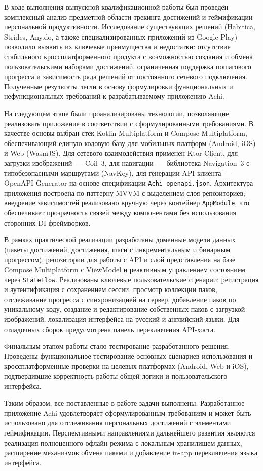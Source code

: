 \documentclass[../main.tex]{subfiles}
\begin{document}
В ходе выполнения выпускной квалификационной работы был проведён комплексный анализ предметной области трекинга достижений и геймификации персональной продуктивности. Исследование существующих решений (Habitica, Strides, Any.do, а также специализированных приложений из Google Play) позволило выявить их ключевые преимущества и недостатки: отсутствие стабильного кроссплатформенного продукта с возможностью создания и обмена пользовательскими наборами достижений, ограниченная поддержка пошагового прогресса и зависимость ряда решений от постоянного сетевого подключения. Полученные результаты легли в основу формулировки функциональных и нефункциональных требований к разрабатываемому приложению Achi.

На следующем этапе были проанализированы технологии, позволяющие реализовать приложение в соответствии с сформулированными требованиями. В качестве основы выбран стек Kotlin Multiplatform и Compose Multiplatform, обеспечивающий единую кодовую базу для мобильных платформ (Android, iOS) и Web (WasmJS). Для сетевого взаимодействия применён Ktor Client, для загрузки изображений~--- Coil~3, для навигации~--- библиотека Navigation~3 с типобезопасными маршрутами (NavKey), для генерации API-клиента~--- OpenAPI Generator на основе спецификации \texttt{Achi\_openapi.json}. Архитектура приложения построена по паттерну MVVM с выделением слоя репозиториев; внедрение зависимостей реализовано вручную через контейнер \texttt{AppModule}, что обеспечивает прозрачность связей между компонентами без использования сторонних DI-фреймворков.

В рамках практической реализации разработаны доменные модели данных (пакеты достижений, достижения, шаги с инкрементальным и бинарным прогрессом), репозитории для работы с API и слой представления на базе Compose Multiplatform с ViewModel и реактивным управлением состоянием через \texttt{StateFlow}. Реализованы ключевые пользовательские сценарии: регистрация и аутентификация с сохранением сессии, просмотр коллекции паков, отслеживание прогресса с синхронизацией на сервер, добавление паков по уникальному коду, создание и редактирование собственных паков с загрузкой изображений, локализация интерфейса на русский и английский языки. Для отладочных сборок предусмотрена панель переключения API-хоста.

Финальным этапом работы стало тестирование разработанного решения. Проведены функциональное тестирование основных сценариев использования и кроссплатформенные проверки на целевых платформах (Android, Web и iOS), подтвердившие корректность работы общей логики и пользовательского интерфейса.

Таким образом, все поставленные в работе задачи выполнены. Разработанное приложение Achi удовлетворяет сформулированным требованиям и может быть использовано для отслеживания персональных достижений с элементами геймификации. Перспективными направлениями дальнейшего развития являются реализация полноценного офлайн-режима с локальным хранилищем данных, расширение механизмов обмена паками и добавление in-app переключения языка интерфейса.
\end{document}
